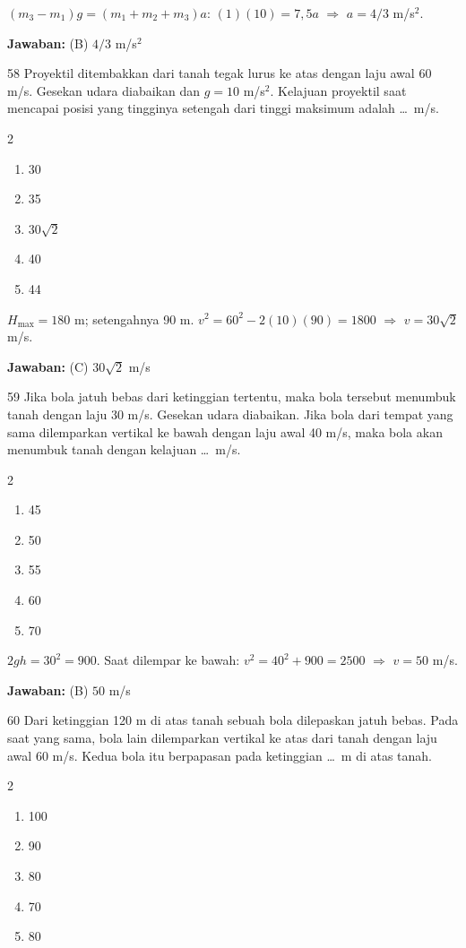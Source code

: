 \documentclass[11pt]{article}
\newenvironment{pilB}{%
  \par\smallskip\begin{multicols}{2}
  \begin{enumerate}[label=(\Alph*),leftmargin=*,itemsep=1pt,topsep=3pt]}%
  {\end{enumerate}\end{multicols}}
\newcommand{\jawaban}[1]{%
  \noindent\colorbox{gold!30}{\parbox{\dimexpr\linewidth-2\fboxsep\relax}{%
    \textbf{Jawaban:} #1}}\par\smallskip}
\begin{document}
\begin{pembox}
$(m_3-m_1)g=(m_1+m_2+m_3)a$: $(1)(10)=7{,}5a$ $\Rightarrow$ $a=4/3$ m/s$^2$.
\jawaban{(B) $4/3$ m/s$^2$}
\end{pembox}

\begin{soal}{58}
Proyektil ditembakkan dari tanah tegak lurus ke atas dengan laju awal
60 m/s. Gesekan udara diabaikan dan $g=10$ m/s$^2$. Kelajuan proyektil
saat mencapai posisi yang tingginya setengah dari tinggi maksimum adalah
\ldots\ m/s.
\begin{pilB}
  \item 30 \item 35 \item $30\sqrt{2}$ \item 40 \item 44
\end{pilB}
\end{soal}

\begin{pembox}
$H_{\max}=180$ m; setengahnya 90 m. $v^2=60^2-2(10)(90)=1800$ $\Rightarrow$ $v=30\sqrt{2}$ m/s.
\jawaban{(C) $30\sqrt{2}$ m/s}
\end{pembox}

\begin{soal}{59}
Jika bola jatuh bebas dari ketinggian tertentu, maka bola tersebut
menumbuk tanah dengan laju 30 m/s. Gesekan udara diabaikan. Jika bola
dari tempat yang sama dilemparkan vertikal ke bawah dengan laju awal
40 m/s, maka bola akan menumbuk tanah dengan kelajuan \ldots\ m/s.
\begin{pilB}
  \item 45 \item 50 \item 55 \item 60 \item 70
\end{pilB}
\end{soal}

\begin{pembox}
$2gh=30^2=900$. Saat dilempar ke bawah: $v^2=40^2+900=2500$ $\Rightarrow$ $v=50$ m/s.
\jawaban{(B) $50$ m/s}
\end{pembox}

\begin{soal}{60}
Dari ketinggian 120 m di atas tanah sebuah bola dilepaskan jatuh bebas.
Pada saat yang sama, bola lain dilemparkan vertikal ke atas dari tanah
dengan laju awal 60 m/s. Kedua bola itu berpapasan pada ketinggian
\ldots\ m di atas tanah.
\begin{pilB}
  \item 100 \item 90 \item 80 \item 70 \item 80
\end{pilB}
\end{soal}
\end{document}
